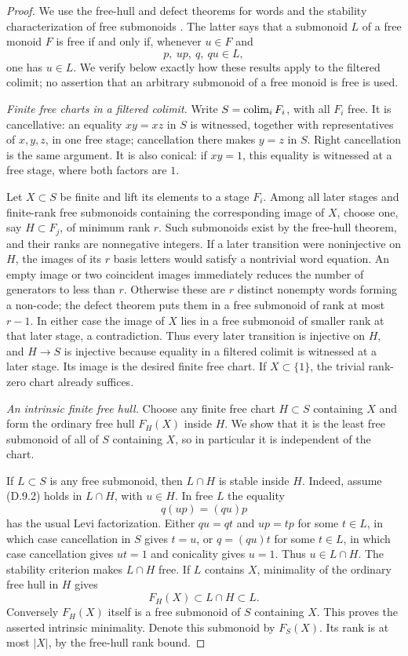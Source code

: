 \begin{proof}
We use the free-hull and defect theorems for words
\citep[Section~2, Theorems~2.1--2.2]{DGCastiglioneFiciRestivo2019}
and the stability characterization of free submonoids
\citep[Theorem~1, p.~84]{DGCarpiDAlessandro2014}.
The latter says that a submonoid $L$ of a free monoid $F$ is free
if and only if, whenever $u\in F$ and
\[
 p,\ up,\ q,\ qu\in L,
 \tag{D.9.2}
\]
one has $u\in L$. We verify below exactly how these results apply
to the filtered colimit; no assertion that an arbitrary submonoid
of a free monoid is free is used.

\emph{Finite free charts in a filtered colimit.}
Write $S=\operatorname*{colim}_i F_i$, with all $F_i$ free. It is cancellative:
an equality $xy=xz$ in $S$ is witnessed, together with representatives
of $x,y,z$, in one free stage; cancellation there makes $y=z$ in
$S$. Right cancellation is the same argument. It is also conical:
if $xy=1$, this equality is witnessed at a free stage, where both
factors are $1$.

Let $X\subset S$ be finite and lift its elements to a stage $F_i$.
Among all later stages and finite-rank free submonoids containing
the corresponding image of $X$, choose one, say $H\subset F_j$,
of minimum rank $r$. Such submonoids exist by the free-hull theorem,
and their ranks are nonnegative integers. If a later transition
were noninjective on $H$, the images of its $r$ basis letters would
satisfy a nontrivial word equation. An empty image or two coincident
images immediately reduces the number of generators to less than
$r$. Otherwise these are $r$ distinct nonempty words forming a
non-code; the defect theorem puts them in a free submonoid of rank
at most $r-1$. In either case the image of $X$ lies in a free
submonoid of smaller rank at that later stage, a contradiction.
Thus every later transition is injective on $H$, and $H\to S$ is
injective because equality in a filtered colimit is witnessed at
a later stage. Its image is the desired finite free chart. If
$X\subset\{1\}$, the trivial rank-zero chart already suffices.

\emph{An intrinsic finite free hull.}
Choose any finite free chart $H\subset S$ containing $X$ and form
the ordinary free hull $F_H(X)$ inside $H$. We show that it is the
least free submonoid of all of $S$ containing $X$, so in particular
it is independent of the chart.

If $L\subset S$ is any free submonoid, then $L\cap H$ is stable
inside $H$. Indeed, assume (D.9.2) holds in $L\cap H$, with
$u\in H$. In free $L$ the equality
\[
 q(up)=(qu)p
\]
has the usual Levi factorization. Either $qu=qt$ and $up=tp$
for some $t\in L$, in which case cancellation in $S$ gives
$t=u$, or $q=(qu)t$ for some $t\in L$, in which case cancellation
gives $ut=1$ and conicality gives $u=1$. Thus $u\in L\cap H$.
The stability criterion makes $L\cap H$ free. If $L$ contains
$X$, minimality of the ordinary free hull in $H$ gives
\[
 F_H(X)\subset L\cap H\subset L.
\]
Conversely $F_H(X)$ itself is a free submonoid of $S$ containing
$X$. This proves the asserted intrinsic minimality. Denote this
submonoid by $F_S(X)$. Its rank is at most $|X|$, by the free-hull
rank bound.


\end{proof}
